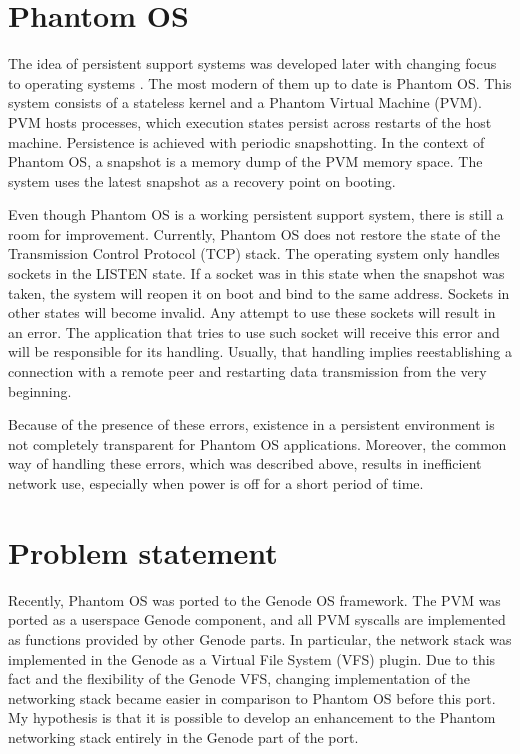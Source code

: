 \section{Phantom OS}
\label{sec:int:phantom}

The idea of persistent support systems was developed later with changing focus
to operating systems \cite{landau1992checkpoint,dearle1994grasshopper}. The
most modern of them up to date is Phantom OS. This system consists of a
stateless kernel and a Phantom Virtual Machine (PVM). PVM hosts processes,
which execution states persist across restarts of the host machine. Persistence
is achieved with periodic snapshotting. In the context of Phantom OS, a
snapshot is a memory dump of the PVM memory space. The system uses the latest
snapshot as a recovery point on booting.

Even though Phantom OS is a working persistent support system, there is still a
room for improvement. Currently, Phantom OS does not restore the state of the
Transmission Control Protocol (TCP) stack. The operating system only handles
sockets in the LISTEN state. If a socket was in this state when the snapshot
was taken, the system will reopen it on boot and bind to the same address.
Sockets in other states will become invalid. Any attempt to use these sockets
will result in an error. The application that tries to use such socket will
receive this error and will be responsible for its handling. Usually, that
handling implies reestablishing a connection with a remote peer and restarting
data transmission from the very beginning.

Because of the presence of these errors, existence in a persistent environment
is not completely transparent for Phantom OS applications. Moreover, the common
way of handling these errors, which was described above, results in inefficient
network use, especially when power is off for a short period of time.

\section{Problem statement}

Recently, Phantom OS was ported to the Genode OS framework. The PVM was ported
as a userspace Genode component, and all PVM syscalls are implemented as
functions provided by other Genode parts. In particular, the network stack was
implemented in the Genode as a Virtual File System (VFS) plugin. Due to this
fact and the flexibility of the Genode VFS, changing implementation of the
networking stack became easier in comparison to Phantom OS before this port. My
hypothesis is that it is possible to develop an enhancement to the Phantom
networking stack entirely in the Genode part of the port.

